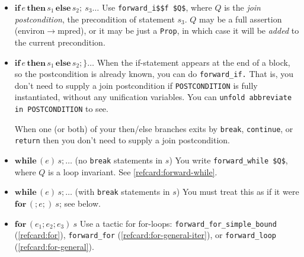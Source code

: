 \documentclass[12pt,fleqn,openany,oneside,showtrims]{memoir}
\begin{document}
\begin{itemize}
\item $\mathbf{if}\,e\,\textbf{then}\,s_1\,\textbf{else}\,s_2;~s_3\ldots$
  \newline
  Use \lstinline{forward_i$$f $Q$}, where $Q$ is
\label{refcard:forward-if}
  the \emph{join postcondition}, the precondition of
  statement $s_3$.  $Q$ may be a full assertion
  (environ$\rightarrow$mpred), or it may be just a \lstinline{Prop},
  in which case it will be \emph{added} to the current precondition.
\item $\mathbf{if}\,e\,\mathbf{then}\,s_1\,\mathbf{else}\,s_2;\}\ldots$
  \newline
  When the if-statement appears at the end of a block, so the
  postcondition is already known, you can do \lstinline{forward_if.}
  That is, you don't need to supply a join postcondition if
  \lstinline{POSTCONDITION} is fully instantiated, without any
  unification variables.  You can
  \lstinline{unfold abbreviate in POSTCONDITION} to see.

  When one (or both) of your then/else branches
  exits by \lstinline{break}, \lstinline{continue}, or \lstinline{return}
  then you don't need to supply a join postcondition.

\item $\mathbf{while}\,(e)\,s; \ldots$ \qquad (no \lstinline{break} statements in $s$)\newline
  You write \lstinline{forward_while $Q$}, where $Q$ is a loop invariant.
  See \autoref{refcard:forward-while}.

\item $\mathbf{while}\,(e)\,s; \ldots$ \qquad (with \lstinline{break} statements in $s$)\newline
  You must treat this as if it were $\mathbf{for}\,(;e;)~ s$; see below.

\item $\mathbf{for}\,(e_1;e_2;e_3)~ s$ \newline
  Use a tactic for for-loops:\newline
  \lstinline{forward_for_simple_bound} (\autoref{refcard:for}), \newline
  \lstinline{forward_for} (\autoref{refcard:for-general-iter}), or \newline
  \lstinline{forward_loop} (\autoref{refcard:for-general}).
\end{itemize}
\end{document}
